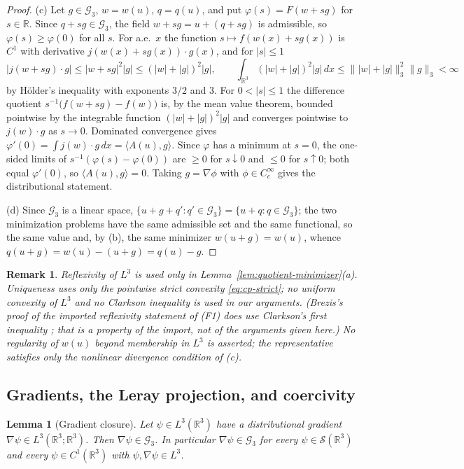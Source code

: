 \documentclass[11pt]{article}
\newtheorem{remark}[theorem]{Remark}
\newtheorem{lemma}[theorem]{Lemma}
\theoremstyle{definition}
\theoremstyle{plain}
\newcommand{\R}{\mathbb R}
\newcommand{\norm}[1]{\lVert #1\rVert}
\begin{document}
\begin{proof}
(c) Let $g\in\mathcal G_3$, $w=w(u)$, $q=q(u)$, and put
$\varphi(s)=F(w+sg)$ for $s\in\R$.  Since $q+sg\in\mathcal G_3$, the field
$w+sg=u+(q+sg)$ is admissible, so $\varphi(s)\ge\varphi(0)$ for all $s$.
For a.e.\ $x$ the function $s\mapsto f(w(x)+sg(x))$ is $C^1$ with
derivative $j(w(x)+sg(x))\cdot g(x)$, and for $|s|\le1$
\[
 \bigl|j(w+sg)\cdot g\bigr|\le|w+sg|^2|g|\le(|w|+|g|)^2|g|,
 \qquad
 \int_{\R^3}(|w|+|g|)^2|g|\,dx\le\norm{|w|+|g|}_3^2\norm g_3<\infty
\]
by H\"older's inequality with exponents $3/2$ and $3$.  For
$0<|s|\le1$ the difference quotient
$s^{-1}\bigl(f(w+sg)-f(w)\bigr)$ is, by the mean value theorem, bounded
pointwise by the integrable function $(|w|+|g|)^2|g|$ and converges
pointwise to $j(w)\cdot g$ as $s\to0$.  Dominated convergence gives
$\varphi'(0)=\int j(w)\cdot g\,dx=\langle A(u),g\rangle$.  Since
$\varphi$ has a minimum at $s=0$, the one-sided limits of
$s^{-1}(\varphi(s)-\varphi(0))$ are $\ge0$ for $s\downarrow0$ and
$\le0$ for $s\uparrow0$; both equal $\varphi'(0)$, so
$\langle A(u),g\rangle=0$.  Taking $g=\nabla\phi$ with
$\phi\in C_c^\infty$ gives the distributional statement.

(d) Since $\mathcal G_3$ is a linear space,
$\{u+g+q':q'\in\mathcal G_3\}=\{u+q:q\in\mathcal G_3\}$; the two
minimization problems have the same admissible set and the same
functional, so the same value and, by (b), the same minimizer
$w(u+g)=w(u)$, whence $q(u+g)=w(u)-(u+g)=q(u)-g$.
\end{proof}

\begin{remark}
Reflexivity of $L^3$ is used only in Lemma~\ref{lem:quotient-minimizer}(a).
Uniqueness uses only the pointwise strict convexity \eqref{eq:cp-strict};
no uniform convexity of $L^3$ and no Clarkson inequality is used in our
arguments.  (Brezis's proof of the imported reflexivity statement of (F1)
does use Clarkson's first inequality \cite[p.~95]{Brezis2011}; that is a
property of the import, not of the arguments given here.)  No regularity
of $w(u)$ beyond membership in $L^3$ is asserted; the representative
satisfies only the nonlinear divergence condition of (c).
\end{remark}

\subsection{Gradients, the Leray projection, and coercivity}

\begin{lemma}[Gradient closure]\label{lem:gradient-closure}
Let $\psi\in L^3(\R^3)$ have a distributional gradient
$\nabla\psi\in L^3(\R^3;\R^3)$.  Then $\nabla\psi\in\mathcal G_3$.  In
particular $\nabla\psi\in\mathcal G_3$ for every $\psi\in\mathcal S(\R^3)$
and every $\psi\in C^1(\R^3)$ with $\psi,\nabla\psi\in L^3$.
\end{lemma}
\end{document}
